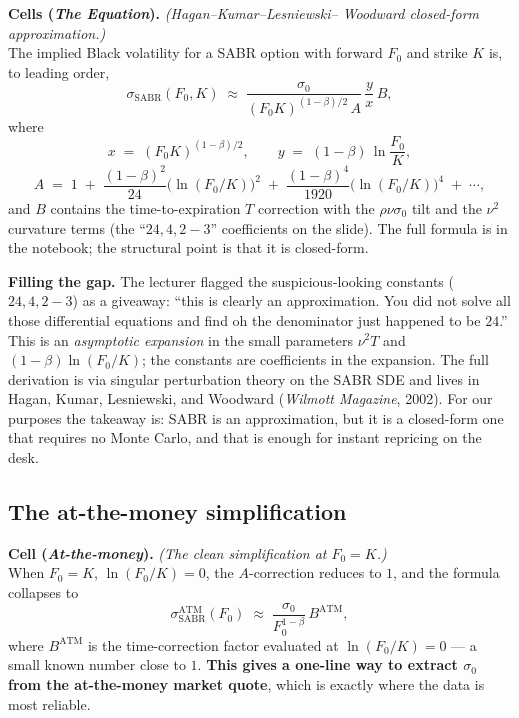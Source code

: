 \begin{keyblock}
\textbf{Cells (\emph{The Equation}).} \emph{(Hagan--Kumar--Lesniewski--
Woodward closed-form approximation.)}\\
The implied Black volatility for a SABR option with forward $F_0$ and
strike $K$ is, to leading order,
\[
  \sigma_{\text{SABR}}(F_0, K)
     \;\approx\; \frac{\sigma_0}{(F_0 K)^{(1-\beta)/2}\,A}\,
        \frac{y}{x}\,B,
\]
where
\[
  x \;=\; (F_0 K)^{(1-\beta)/2},
  \qquad
  y \;=\; (1 - \beta)\,\ln\!\frac{F_0}{K},
\]
\[
  A \;=\; 1 \;+\; \frac{(1-\beta)^2}{24}\bigl(\ln(F_0/K)\bigr)^2
        \;+\; \frac{(1-\beta)^4}{1920}\bigl(\ln(F_0/K)\bigr)^4 \;+\; \cdots,
\]
and $B$ contains the time-to-expiration $T$ correction with the
$\rho \nu \sigma_0$ tilt and the $\nu^2$ curvature terms (the
``$24, 4, 2-3$'' coefficients on the slide). The full formula is in
the notebook; the structural point is that it is closed-form.
\end{keyblock}

\begin{tipblock}
\textbf{Filling the gap.} The lecturer flagged the suspicious-looking
constants ($24, 4, 2-3$) as a giveaway: ``this is clearly an
approximation. You did not solve all those differential equations
and find oh the denominator just happened to be $24$.'' This is an
\emph{asymptotic expansion} in the small parameters $\nu^2 T$ and
$(1-\beta)\ln(F_0/K)$; the constants are coefficients in the expansion.
The full derivation is via singular perturbation theory on the SABR
SDE and lives in Hagan, Kumar, Lesniewski, and Woodward
(\emph{Wilmott Magazine}, 2002). For our purposes the takeaway is:
SABR is an approximation, but it is a closed-form one that requires no
Monte Carlo, and that is enough for instant repricing on the desk.
\end{tipblock}

\subsection{The at-the-money simplification}\label{L7-sec:atmsimp}

\begin{keyblock}
\textbf{Cell (\emph{At-the-money}).} \emph{(The clean simplification at
$F_0 = K$.)}\\
When $F_0 = K$, $\ln(F_0/K) = 0$, the $A$-correction reduces to $1$,
and the formula collapses to
\[
  \sigma_{\text{SABR}}^{\text{ATM}}(F_0)
     \;\approx\; \frac{\sigma_0}{F_0^{1-\beta}}\,B^{\text{ATM}},
\]
where $B^{\text{ATM}}$ is the time-correction factor evaluated at
$\ln(F_0/K) = 0$ --- a small known number close to $1$. \textbf{This
gives a one-line way to extract $\sigma_0$ from the at-the-money
market quote}, which is exactly where the data is most reliable.
\end{keyblock}

